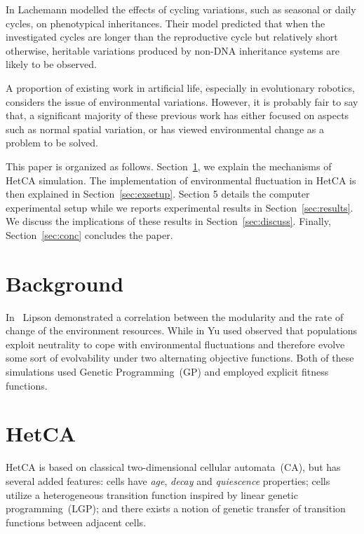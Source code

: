 \documentclass[letterpaper]{article}
\begin{document}
In \citep{lachmann1996inheritance} Lachemann modelled the effects of cycling variations, such as seasonal or daily cycles, on phenotypical inheritances. Their model predicted that when the investigated cycles are longer than the reproductive cycle but relatively short otherwise, heritable variations produced by non-DNA inheritance systems are likely to be observed.

A proportion of existing work in artificial life, especially in evolutionary robotics\citep{floreano2000evolutionary}, considers the issue of environmental variations. However, it is probably fair to say that, a significant majority of these previous work has either focused on aspects such as normal spatial variation, or has viewed environmental change as a problem to be solved.

This paper is organized as follows. Section~\ref{sec:bground}, we explain the mechanisms of HetCA simulation. The implementation of environmental fluctuation in HetCA is then explained in Section~\ref{sec:exsetup}. Section 5 details the computer experimental setup while we reports experimental results in Section~\ref{sec:results}. We discuss the implications of these results in Section~\ref{sec:discuss}. Finally, Section~\ref{sec:conc} concludes the paper.


\section{Background}\label{sec:bground}
In~\citep{lipson2002origin} Lipson demonstrated a correlation between the modularity and the rate of change of the environment resources. While in \citep{yu2007program} Yu used observed that populations exploit neutrality to cope with environmental fluctuations and therefore evolve some sort of evolvability under two alternating objective functions. Both of these simulations used Genetic Programming~(GP) and employed explicit fitness functions.

\section{HetCA}\label{sec:hetca)}
HetCA is based on classical two-dimensional cellular automata~(CA), but has several added features: cells have \emph{age}, \emph{decay} and \emph{quiescence} properties; cells utilize a heterogeneous transition function inspired by linear genetic programming~(LGP); and there exists a notion of genetic transfer of transition functions between adjacent cells.
\end{document}
